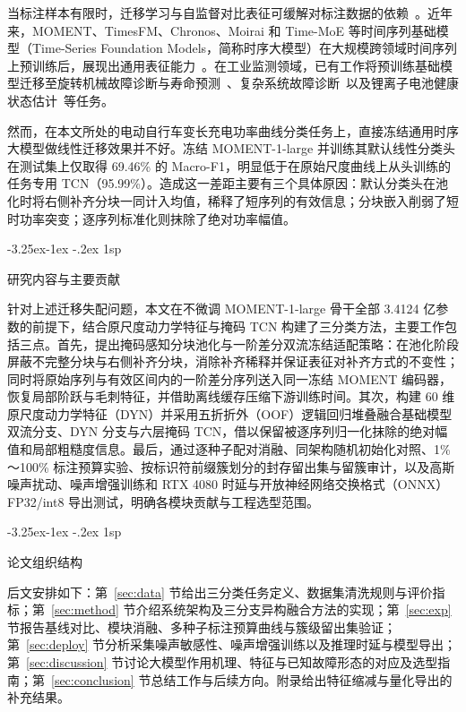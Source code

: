 \documentclass[12pt]{iopjournal}
\makeatletter
\renewcommand\subsection{\@startsection{subsection}{2}{\z@}%
                   {-3.25ex\@plus -1ex \@minus -.2ex}%
                   {1sp}%
                   {\reset@font\normalsize\bfseries\raggedright}}
\makeatother
\begin{document}
当标注样本有限时，迁移学习与自监督对比表征可缓解对标注数据的依赖~\cite{eldele2021,yue2022}。近年来，MOMENT、TimesFM、Chronos、Moirai 和 Time-MoE 等时间序列基础模型（Time-Series Foundation Models，简称时序大模型）在大规模跨领域时间序列上预训练后，展现出通用表征能力~\cite{goswami2024,das2024,ansari2024,woo2024,shi2025}。在工业监测领域，已有工作将预训练基础模型迁移至旋转机械故障诊断与寿命预测~\cite{wang2025}、复杂系统故障诊断~\cite{zheng2024}以及锂离子电池健康状态估计~\cite{sun2025b}等任务。

然而，在本文所处的电动自行车变长充电功率曲线分类任务上，直接冻结通用时序大模型做线性迁移效果并不好。冻结 MOMENT-1-large 并训练其默认线性分类头在测试集上仅取得 69.46\% 的 Macro-F1，明显低于在原始尺度曲线上从头训练的任务专用 TCN（95.99\%）。造成这一差距主要有三个具体原因：默认分类头在池化时将右侧补齐分块一同计入均值，稀释了短序列的有效信息；分块嵌入削弱了短时功率突变；逐序列标准化则抹除了绝对功率幅值。

\subsection{研究内容与主要贡献}

针对上述迁移失配问题，本文在不微调 MOMENT-1-large 骨干全部 3.4124 亿参数的前提下，结合原尺度动力学特征与掩码 TCN 构建了三分类方法，主要工作包括三点。首先，提出掩码感知分块池化与一阶差分双流冻结适配策略：在池化阶段屏蔽不完整分块与右侧补齐分块，消除补齐稀释并保证表征对补齐方式的不变性；同时将原始序列与有效区间内的一阶差分序列送入同一冻结 MOMENT 编码器，恢复局部阶跃与毛刺特征，并借助离线缓存压缩下游训练时间。其次，构建 60 维原尺度动力学特征（DYN）并采用五折折外（OOF）逻辑回归堆叠融合基础模型双流分支、DYN 分支与六层掩码 TCN，借以保留被逐序列归一化抹除的绝对幅值和局部粗糙度信息。最后，通过逐种子配对消融、同架构随机初始化对照、1\%～100\% 标注预算实验、按标识符前缀簇划分的封存留出集与留簇审计，以及高斯噪声扰动、噪声增强训练和 RTX 4080 时延与开放神经网络交换格式（ONNX）FP32/int8 导出测试，明确各模块贡献与工程选型范围。

\subsection{论文组织结构}

后文安排如下：第~\ref{sec:data} 节给出三分类任务定义、数据集清洗规则与评价指标；第~\ref{sec:method} 节介绍系统架构及三分支异构融合方法的实现；第~\ref{sec:exp} 节报告基线对比、模块消融、多种子标注预算曲线与簇级留出集验证；第~\ref{sec:deploy} 节分析采集噪声敏感性、噪声增强训练以及推理时延与模型导出；第~\ref{sec:discussion} 节讨论大模型作用机理、特征与已知故障形态的对应及选型指南；第~\ref{sec:conclusion} 节总结工作与后续方向。附录给出特征缩减与量化导出的补充结果。
\end{document}
